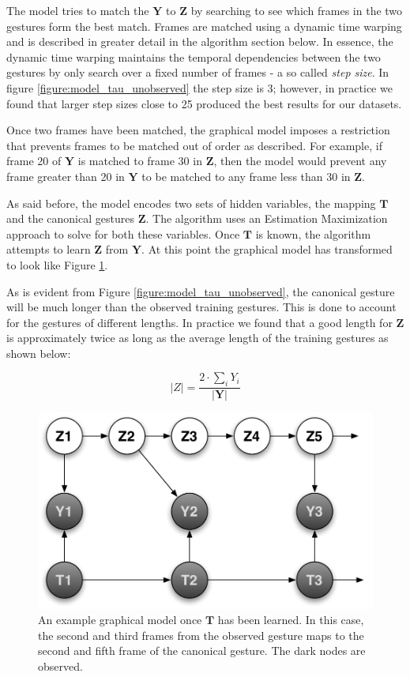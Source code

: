 \documentclass{article}
\begin{document}
The model tries to match the $\mathbf{Y}$ to $\mathbf{Z}$ by searching to see
which frames in the two gestures form the best match. Frames are matched using a
dynamic time warping and is described in greater detail in the algorithm section
below. In essence, the dynamic time warping maintains the temporal dependencies
between the two gestures by only search over a fixed number of frames - a so
called \emph{step size}. In figure \ref{figure:model_tau_unobserved} the step
size is 3; however, in practice we found that larger step sizes close to 25
produced the best results for our datasets.

Once two frames have been matched, the graphical model imposes a restriction
that prevents frames to be matched out of order as described. For example, if
frame 20 of $\mathbf{Y}$ is matched to frame 30 in $\mathbf{Z}$, then the model
would prevent any frame greater than 20 in $\mathbf{Y}$ to be matched to any
frame less than 30 in $\mathbf{Z}$.

As said before, the model encodes two sets of hidden variables, the mapping
$\mathbf{T}$ and the canonical gestures $\mathbf{Z}$. The algorithm uses an
Estimation Maximization approach to solve for both these variables. Once
$\mathbf{T}$ is known, the algorithm attempts to learn $\mathbf{Z}$ from
$\mathbf{Y}$. At this point the graphical model has transformed to look like
Figure \ref{figure:model_tau_observed}.

As is evident from Figure \ref{figure:model_tau_unobserved}, the canonical
gesture will be much longer than the observed training gestures. This is done to
account for the gestures of different lengths. In practice we found that a good
length for $\mathbf{Z}$ is approximately twice as long as the average length of
the training gestures as shown below:

\begin{equation}
\label{lengthZ}
|Z| = \frac{2 \cdot \sum_{i}{Y_i}}{|\mathbf{Y}|}
\end{equation}

\begin{figure}
\begin{centering}
\includegraphics[width=0.63\columnwidth]{figures/model_tau_observed.pdf}

\caption{An example graphical model once $\mathbf{T}$ has been learned. In this
case, the second and third frames from the observed gesture maps to the second
and fifth frame of the canonical gesture. The dark nodes are observed.
\label{figure:model_tau_observed}}

\end{centering}
\end{figure}
\end{document}
